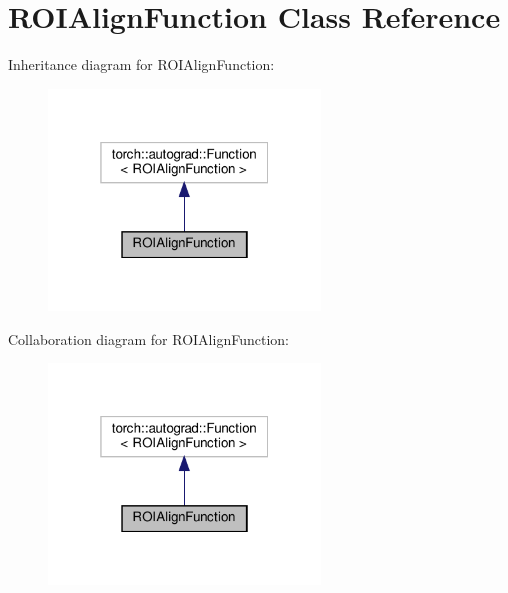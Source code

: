 \hypertarget{classROIAlignFunction}{}\section{R\+O\+I\+Align\+Function Class Reference}
\label{classROIAlignFunction}


Inheritance diagram for R\+O\+I\+Align\+Function\+:
\nopagebreak
\begin{figure}[H]
\begin{center}
\leavevmode
\includegraphics[width=205pt]{classROIAlignFunction__inherit__graph}
\end{center}
\end{figure}


Collaboration diagram for R\+O\+I\+Align\+Function\+:
\nopagebreak
\begin{figure}[H]
\begin{center}
\leavevmode
\includegraphics[width=205pt]{classROIAlignFunction__coll__graph}
\end{center}
\end{figure}

